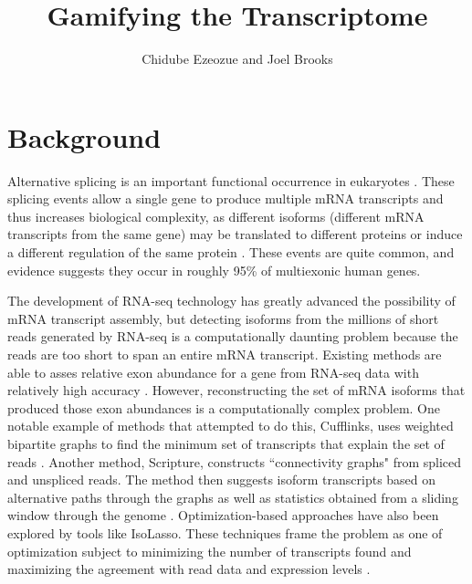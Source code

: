 \documentclass[12pt]{article}
\title{Gamifying the Transcriptome}
\author{Chidube Ezeozue and Joel Brooks}
\begin{document}

\renewcommand\refname{Bibliography}
\maketitle

\begin{abstract}

\end{abstract}

\section{Background}
Alternative splicing is an important functional occurrence in eukaryotes \citep{pan2008deep}. These splicing events allow a single gene to produce multiple mRNA transcripts and thus increases biological complexity, as different isoforms (different mRNA transcripts from the same gene) may be translated to different proteins or induce a different regulation of the same protein \citep{trapnell2010transcript}. These events are quite common, and evidence suggests they occur in roughly 95\% of multiexonic human genes.

The development of RNA-seq technology has greatly advanced the possibility of mRNA transcript assembly, but detecting isoforms from the millions of short reads generated by RNA-seq is a computationally daunting problem because the reads are too short to span an entire mRNA transcript. Existing methods are able to asses relative exon abundance for a gene from RNA-seq data with relatively high accuracy \citep{trapnell2009tophat}. However, reconstructing the set of mRNA isoforms that produced those exon abundances is a computationally complex problem. One notable example of methods that attempted to do this, Cufflinks, uses weighted bipartite graphs to find the minimum set of transcripts that explain the set of reads \citep{trapnell2010transcript}. Another method, Scripture, constructs ``connectivity graphs" from spliced and unspliced reads. The method then suggests isoform transcripts based on alternative paths through the graphs as well as statistics obtained from a sliding window through the genome \citep{guttman2010ab}. Optimization-based approaches have also been explored by tools like IsoLasso. These techniques frame the problem as one of optimization subject to minimizing the number of transcripts found and maximizing the agreement with read data and expression levels \citep{li2011isolasso}.
\end{document}
